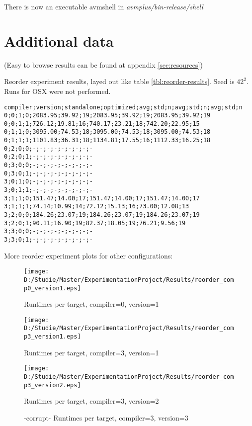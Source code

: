 \documentclass[a4paper,11pt]{scrartcl}
\begin{document}
There is now an executable avmshell in \textit{avmplus/bin-release/shell}

\section{Additional data}
\label{sec:additional-data}

(Easy to browse results can be found at appendix \ref{sec:resources})

Reorder experiment results, layed out like table \ref{tbl:reorder-results}. Seed is $42^2$. Runs for OSX were not performed. 
\begin{verbatim}
compiler;version;standalone;optimized;avg;std;n;avg;std;n;avg;std;n
0;0;1;0;2083.95;39.92;19;2083.95;39.92;19;2083.95;39.92;19
0;0;1;1;726.12;19.81;16;740.17;23.21;18;742.20;22.95;15
0;1;1;0;3095.00;74.53;18;3095.00;74.53;18;3095.00;74.53;18
0;1;1;1;1101.83;36.31;18;1134.81;17.55;16;1112.33;16.25;18
0;2;0;0;-;-;-;-;-;-;-;-;-
0;2;0;1;-;-;-;-;-;-;-;-;-
0;3;0;0;-;-;-;-;-;-;-;-;-
0;3;0;1;-;-;-;-;-;-;-;-;-
3;0;1;0;-;-;-;-;-;-;-;-;-
3;0;1;1;-;-;-;-;-;-;-;-;-
3;1;1;0;151.47;14.00;17;151.47;14.00;17;151.47;14.00;17
3;1;1;1;74.14;10.99;14;72.12;15.13;16;73.00;12.08;13
3;2;0;0;184.26;23.07;19;184.26;23.07;19;184.26;23.07;19
3;2;0;1;90.11;16.90;19;82.37;18.05;19;76.21;9.56;19
3;3;0;0;-;-;-;-;-;-;-;-;-
3;3;0;1;-;-;-;-;-;-;-;-;-
\end{verbatim}

More reorder experiment plots for other configurations:

\begin{figure}[h!]
\centering
\texttt{[image: D:/Studie/Master/ExperimentationProject/Results/reorder\_comp0\_version1.eps]}
\caption{Runtimes per target, compiler=0, version=1}
\end{figure}

\begin{figure}[h!]
\centering
\texttt{[image: D:/Studie/Master/ExperimentationProject/Results/reorder\_comp3\_version1.eps]}
\caption{Runtimes per target, compiler=3, version=1}
\end{figure}

\begin{figure}[h!]
\centering
\texttt{[image: D:/Studie/Master/ExperimentationProject/Results/reorder\_comp3\_version2.eps]}
\caption{Runtimes per target, compiler=3, version=2}
\end{figure}

\begin{figure}[h!]
\centering
\caption{ -corrupt- Runtimes per target, compiler=3, version=3}
\end{figure}
\end{document}
